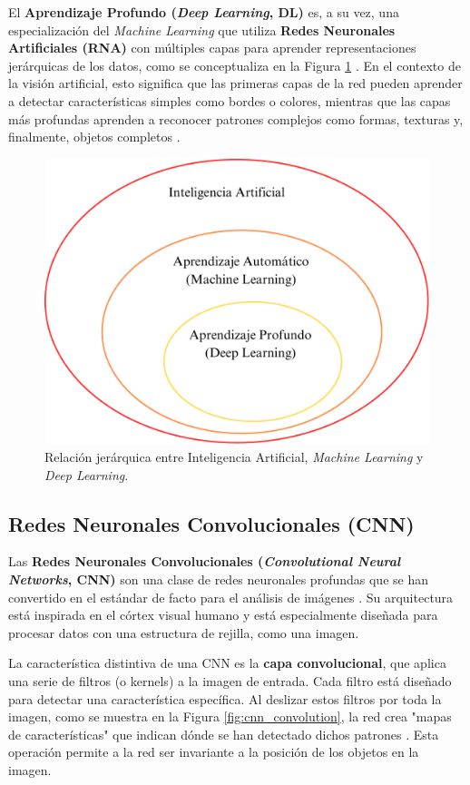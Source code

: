 El \textbf{Aprendizaje Profundo (\textit{Deep Learning}, DL)} es, a su vez, una especialización del \textit{Machine Learning} que utiliza \textbf{Redes Neuronales Artificiales (RNA)} con múltiples capas para aprender representaciones jerárquicas de los datos, como se conceptualiza en la Figura \ref{fig:MLDL} \cite{Goodfellow-et-al-2016}. En el contexto de la visión artificial, esto significa que las primeras capas de la red pueden aprender a detectar características simples como bordes o colores, mientras que las capas más profundas aprenden a reconocer patrones complejos como formas, texturas y, finalmente, objetos completos \cite{centeno2019deep}.

\begin{figure}[H]
    \centering
    \includegraphics[width=0.4\linewidth]{Documento/Imagenes/Marco Teorico/CamposysubcamposIA.pdf}
    \caption{Relación jerárquica entre Inteligencia Artificial, \textit{Machine Learning} y \textit{Deep Learning}.}
    \label{fig:MLDL}
\end{figure}

\subsection{Redes Neuronales Convolucionales (CNN)}
\label{subsec:cnn}

Las \textbf{Redes Neuronales Convolucionales (\textit{Convolutional Neural Networks}, CNN)} son una clase de redes neuronales profundas que se han convertido en el estándar de facto para el análisis de imágenes \cite{lecun1998gradient}. Su arquitectura está inspirada en el córtex visual humano y está especialmente diseñada para procesar datos con una estructura de rejilla, como una imagen.

La característica distintiva de una CNN es la \textbf{capa convolucional}, que aplica una serie de filtros (o kernels) a la imagen de entrada. Cada filtro está diseñado para detectar una característica específica. Al deslizar estos filtros por toda la imagen, como se muestra en la Figura \ref{fig:cnn_convolution}, la red crea "mapas de características" que indican dónde se han detectado dichos patrones \cite{cnnIBM}. Esta operación permite a la red ser invariante a la posición de los objetos en la imagen.

